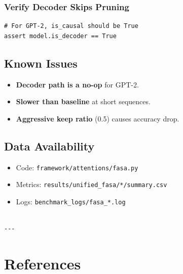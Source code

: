 \subsubsection{Verify Decoder Skips Pruning}

\begin{lstlisting}
# For GPT-2, is_causal should be True
assert model.is_decoder == True
\end{lstlisting}

\subsection{Known Issues}

\begin{itemize}
\item \textbf{Decoder path is a no-op} for GPT-2.
\item \textbf{Slower than baseline} at short sequences.
\item \textbf{Aggressive keep ratio} (0.5) causes accuracy drop.

\end{itemize}
\subsection{Data Availability}

\begin{itemize}
\item Code: \texttt{framework/attentions/fasa.py}
\item Metrics: \texttt{results/unified\_fasa/*/summary.csv}
\item Logs: \texttt{benchmark\_logs/fasa\_*.log}
\end{itemize}
\begin{lstlisting}

---
\end{lstlisting}


\section{References}

